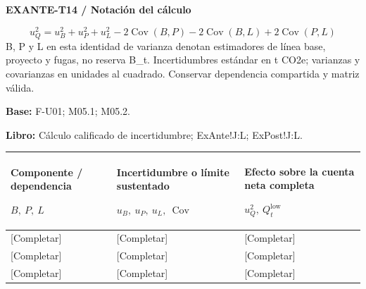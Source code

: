 \par\begingroup\sffamily\fontsize{8}{10}\selectfont\color{NEBGreen}\setlength{\parskip}{2pt}\setlength{\abovedisplayskip}{4pt}\setlength{\belowdisplayskip}{4pt}\setlength{\abovedisplayshortskip}{2pt}\setlength{\belowdisplayshortskip}{3pt}
\textbf{EXANTE-T14 / Notación del cálculo}\par
{\fontsize{9}{11}\selectfont\[ u_Q^2=u_B^2+u_P^2+u_L^2-2\operatorname{Cov}(B,P)-2\operatorname{Cov}(B,L)+2\operatorname{Cov}(P,L) \]}
B, P y L en esta identidad de varianza denotan estimadores de línea base, proyecto y fugas, no reserva B\_t. Incertidumbres estándar en t CO2e; varianzas y covarianzas en unidades al cuadrado. Conservar dependencia compartida y matriz válida.\par
\textbf{Base:} F-U01; M05.1; M05.2.\par
\textbf{Libro:} Cálculo calificado de incertidumbre; ExAnte!J:L; ExPost!J:L.\par\endgroup
{\sffamily\fontsize{8.3}{10.3}\selectfont\begin{longtable}{@{}P{54.83mm} P{54.83mm} P{54.83mm}@{}}
\toprule
\textbf{Componente / dependencia}\par {\normalfont\fontsize{8.2}{10}\selectfont $B,\ P,\ L$} & \textbf{Incertidumbre o límite sustentado}\par {\normalfont\fontsize{8.2}{10}\selectfont $u_B,\ u_P,\ u_L,\ \operatorname{Cov}$} & \textbf{Efecto sobre la cuenta neta completa}\par {\normalfont\fontsize{8.2}{10}\selectfont $u_Q^2,\ Q_t^{\mathrm{low}}$}\\\midrule\endhead
\rule{0pt}{8mm}[Completar] & [Completar] & [Completar]\\\hline
\rule{0pt}{8mm}[Completar] & [Completar] & [Completar]\\\hline
\rule{0pt}{8mm}[Completar] & [Completar] & [Completar]\\\hline
\end{longtable}}

